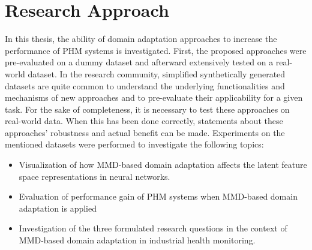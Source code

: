 \section{Research Approach}
In this thesis, the ability of domain adaptation approaches to increase the performance of PHM systems is investigated. First, the proposed approaches were pre-evaluated on a dummy dataset and afterward extensively tested on a real-world dataset. In the research community, simplified synthetically generated datasets are quite common to understand the underlying functionalities and mechanisms of new approaches and to pre-evaluate their applicability for a given task. For the sake of completeness, it is necessary to test these approaches on real-world data. When this has been done correctly, statements about these approaches' robustness and actual benefit can be made. Experiments on the mentioned datasets were performed to investigate the following topics:
\begin{itemize}
    \item  Visualization of how MMD-based domain adaptation affects the latent feature space representations in neural networks.
    \item Evaluation of performance gain of PHM systems when MMD-based domain adaptation is applied
    \item Investigation of the three formulated research questions in the context of MMD-based domain adaptation in industrial health monitoring.
\end{itemize}

